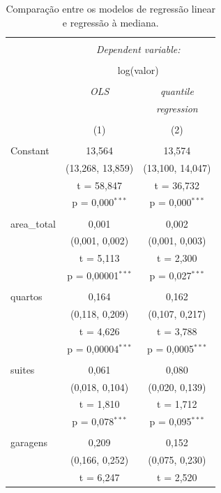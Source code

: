 \documentclass[a4paper, 12pt]{article}
\begin{document}
\begin{table}[!htbp] \centering 
  \caption{Comparação entre os modelos de regressão linear e regressão à mediana.} 
  \label{tab:mfits} 
\begin{tabular}{@{\extracolsep{5pt}}lcc} 
\\[-1.8ex]\hline 
\hline \\[-1.8ex] 
 & \multicolumn{2}{c}{\textit{Dependent variable:}} \\ 
\cline{2-3} 
\\[-1.8ex] & \multicolumn{2}{c}{log(valor)} \\ 
\\[-1.8ex] & \textit{OLS} & \textit{quantile} \\ 
 & \textit{} & \textit{regression} \\ 
\\[-1.8ex] & (1) & (2)\\ 
\hline \\[-1.8ex] 
 Constant & 13,564 & 13,574 \\ 
  & (13,268, 13,859) & (13,100, 14,047) \\ 
  & t = 58,847 & t = 36,732 \\ 
  & p = 0,000$^{***}$ & p = 0,000$^{***}$ \\ 
  & & \\ 
 area\_total & 0,001 & 0,002 \\ 
  & (0,001, 0,002) & (0,001, 0,003) \\ 
  & t = 5,113 & t = 2,300 \\ 
  & p = 0,00001$^{***}$ & p = 0,027$^{***}$ \\ 
  & & \\ 
 quartos & 0,164 & 0,162 \\ 
  & (0,118, 0,209) & (0,107, 0,217) \\ 
  & t = 4,626 & t = 3,788 \\ 
  & p = 0,00004$^{***}$ & p = 0,0005$^{***}$ \\ 
  & & \\ 
 suites & 0,061 & 0,080 \\ 
  & (0,018, 0,104) & (0,020, 0,139) \\ 
  & t = 1,810 & t = 1,712 \\ 
  & p = 0,078$^{***}$ & p = 0,095$^{***}$ \\ 
  & & \\ 
 garagens & 0,209 & 0,152 \\ 
  & (0,166, 0,252) & (0,075, 0,230) \\ 
  & t = 6,247 & t = 2,520 \\ 

\end{tabular}
\end{table}
\end{document}
